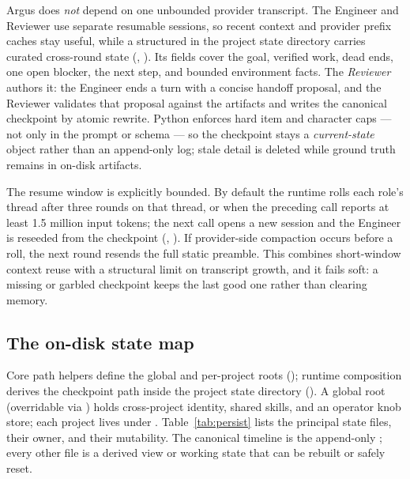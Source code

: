 Argus does \emph{not} depend on one unbounded provider transcript. The Engineer and
Reviewer use separate resumable sessions, so recent context and provider prefix
caches stay useful, while a structured  in the project state
directory carries curated cross-round state (,
). Its  fields cover the goal,
verified work, dead ends, one open blocker, the next step, and bounded environment
facts. The \emph{Reviewer} authors it: the Engineer ends a turn with a concise
handoff proposal, and the Reviewer validates that proposal against the artifacts and
writes the canonical checkpoint by atomic rewrite. Python enforces hard item and
character caps --- not only in the prompt or schema --- so the checkpoint stays a
\emph{current-state} object rather than an append-only log; stale detail is deleted
while ground truth remains in on-disk artifacts.

The resume window is explicitly bounded. By default the runtime rolls each role's
thread after three rounds on that thread, or when the preceding call reports at least
1.5 million input tokens; the next call opens a new session and the Engineer is
reseeded from the checkpoint (, ).
If provider-side compaction occurs before a roll, the next round resends the full
static preamble. This combines short-window context reuse with a structural limit on
transcript growth, and it fails soft: a missing or garbled checkpoint keeps the last
good one rather than clearing memory.

\subsection{The on-disk state map}

Core path helpers define the global and per-project roots ();
runtime composition derives the checkpoint path inside the project state directory
(). A global root 
(overridable via ) holds cross-project identity, shared
skills, and an operator knob store; each project lives under
. Table~\ref{tab:persist} lists the principal state
files, their owner, and their mutability. The canonical timeline is the append-only
; every other file is a derived view or working state that can be
rebuilt or safely reset.

